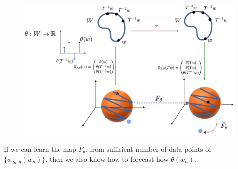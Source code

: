 \begin{figure}[ht]
  \includegraphics[width=0.7\linewidth]{Graphs/_takensmap.eps}
  \centering
 \label{fig:takensmap}
\end{figure}

If we can learn the map $F_\theta$, from sufficient number of data points of $\{\phi_{2d,\theta}(w_n)\}$, then we also know how to forecast how $\theta(w_n)$. 




